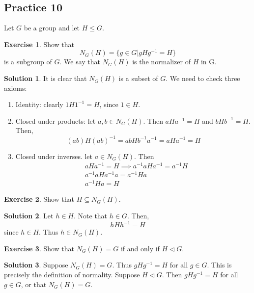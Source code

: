 \documentclass[12pt]{article}
\theoremstyle{definition}
\newtheorem{exercise}{\color{YellowOrange}Exercise}
\theoremstyle{definition}
\newtheorem{solution}{\color{Goldenrod}Solution}
\begin{document}
\subsection{Practice 10}
Let $G$ be a group and let $H \leq G$.
\begin{exercise}
	Show that
	\begin{equation}
		N_G(H) = \{g \in G | gHg^{-1} = H\}
	\end{equation}
	is a subgroup of $G$. We say that $N_G(H)$ is the normalizer of $H$ in G.
\end{exercise}
\begin{solution}
	It is clear that $N_G(H)$ is a subset of $G$. We need to check three axioms:
	\begin{enumerate}
		\item Identity: clearly $1H1^{-1} = H$, since $1 \in H$. 
		\item Closed under products: let $a,b \in N_G(H)$. Then $aHa^{-1} = H$ and $bHb^{-1} = H$. Then,
		\begin{equation}
			(ab)H(ab)^{-1} = abHb^{-1}a^{-1} = aHa^{-1} = H
		\end{equation}
		\item Closed under inverses. let $a \in N_G(H)$. Then
		\begin{align*}
		&aHa^{-1} = H \implies a^{-1}aHa^{-1} = a^{-1}H \\
		&a^{-1}aHa^{-1}a = a^{-1}Ha \\
		&a^{-1}Ha = H
		\end{align*}
	\end{enumerate}
\end{solution}

\begin{exercise}
	Show that $H \subseteq N_G(H)$.
\end{exercise}
\begin{solution}
	Let $h \in H$. Note that $h \in G$. Then,
	\begin{equation}
		hHh^{-1} = H
	\end{equation}
	since $h \in H$. Thus $h \in N_G(H)$.
\end{solution}

\begin{exercise}
	Show that $N_G(H) = G$ if and only if $H \triangleleft G$.
\end{exercise}
\begin{solution}
	Suppose $N_G(H) = G$. Thus $gHg^{-1} = H$ for all $g \in G$. This is precisely the definition of normality. Suppose $H \triangleleft G$. Then $gHg^{-1} = H$ for all $g \in G$, or that $N_G(H) = G$.
\end{solution}
\end{document}

